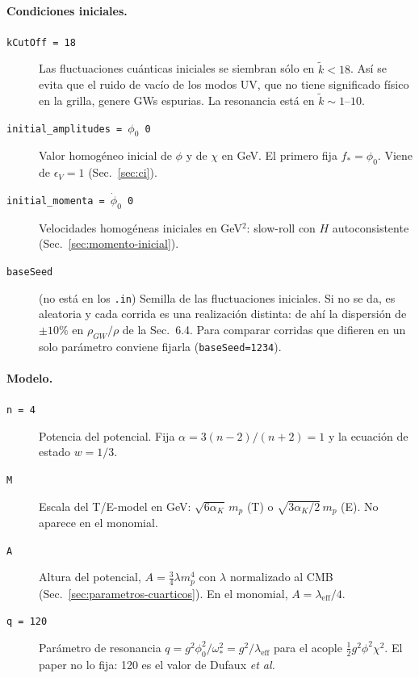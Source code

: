 \documentclass[11pt]{article}
\begin{document}
            \paragraph{Condiciones iniciales.}
            \begin{description}
                \item[\texttt{kCutOff = 18}] Las fluctuaciones cuánticas iniciales se siembran sólo en $\tilde k < 18$. Así se evita que el ruido de vacío de los modos UV, que no tiene significado físico en la grilla, genere GWs espurias. La resonancia está en $\tilde k \sim 1$--$10$.
                \item[\texttt{initial\_amplitudes = $\phi_0$ 0}] Valor homogéneo inicial de $\phi$ y de $\chi$ en GeV. El primero fija $f_* = \phi_0$. Viene de $\epsilon_V = 1$ (Sec.~\ref{sec:ci}).
                \item[\texttt{initial\_momenta = $\dot\phi_0$ 0}] Velocidades homogéneas iniciales en GeV$^2$: slow-roll con $H$ autoconsistente (Sec.~\ref{sec:momento-inicial}).
                \item[\texttt{baseSeed}] (no está en los \texttt{.in}) Semilla de las fluctuaciones iniciales. Si no se da, es aleatoria y cada corrida es una realización distinta: de ahí la dispersión de $\pm 10\%$ en $\rho_{GW}/\rho$ de la Sec.~6.4. Para comparar corridas que difieren en un solo parámetro conviene fijarla (\texttt{baseSeed=1234}).
            \end{description}

            \paragraph{Modelo.}
            \begin{description}
                \item[\texttt{n = 4}] Potencia del potencial. Fija $\alpha = 3(n-2)/(n+2) = 1$ y la ecuación de estado $w = 1/3$.
                \item[\texttt{M}] Escala del T/E-model en GeV: $\sqrt{6\alpha_K}\,m_p$ (T) o $\sqrt{3\alpha_K/2}\,m_p$ (E). No aparece en el monomial.
                \item[\texttt{A}] Altura del potencial, $A = \tfrac34 \lambda m_p^4$ con $\lambda$ normalizado al CMB (Sec.~\ref{sec:parametros-cuarticos}). En el monomial, $A = \lambda_{\text{eff}}/4$.
                \item[\texttt{q = 120}] Parámetro de resonancia $q = g^2\phi_0^2/\omega_*^2 = g^2/\lambda_{\text{eff}}$ para el acople $\tfrac12 g^2\phi^2\chi^2$. El paper no lo fija: 120 es el valor de Dufaux \emph{et al.}
            \end{description}
\end{document}

